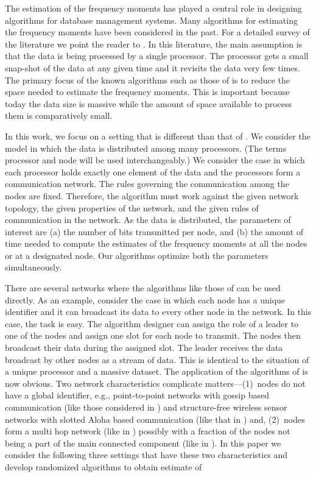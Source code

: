 \documentclass[10pt,twosided,a4paper,draft,onecolumn]{article}
\begin{document}
The estimation of the frequency moments has played a central role in
designing algorithms for database management systems. Many algorithms
for estimating the frequency moments have been considered in the
past. For a detailed survey of the literature we point the reader to
\cite{NelsonThesis11}. In this literature, the main assumption is that
the data is being processed by a single processor. The processor gets
a small snap-shot of the data at any given time and it revisits the
data very few times. The primary focus of the known algorithms such as
those of \cite{Alon96,Ganguly04,Coppersmith04} is to reduce the space
needed to estimate the frequency moments. This is important because
today the data size is massive while
the amount of space available to process them is comparatively small.

In this work, we focus on a setting that is different than that of
\cite{Alon96,Ganguly04,Coppersmith04}. We consider the model in which
the data is distributed among many processors. (The terms processor
and node will be used interchangeably.) We consider the case
in which each processor holds exactly one element of the data and the
processors form a communication network. The rules governing the
communication among the nodes are fixed. Therefore, the algorithm must
work against the given network topology, the given properties of the
network, and the given rules of communication in the network. As the
data is distributed, the parameters of interest are (a) the number of
bits transmitted per node, and (b) the amount of time needed to
compute the estimates of the frequency moments at all the nodes or at
a designated node. Our algorithms optimize both the parameters
simultaneously.

There are several networks where the algorithms like those of
\cite{Alon96,Ganguly04,Coppersmith04} can be used directly. As an
example, consider the case in which each node has a unique identifier
and it can broadcast its data to every other node in the network. In
this case, the task is easy. The algorithm designer can assign the
role of a leader to one of the nodes and assign one slot for each node
to transmit. The nodes then broadcast their data during the assigned
slot. The leader receives the data broadcast by other nodes as a
stream of data. This is identical to the situation of a unique
processor and a massive dataset. The application of the algorithms of \cite{Alon96,Ganguly04,Coppersmith04}
is now obvious. Two network characteristics
complicate matters---(1)~nodes do not have a global identifier, e.g.,
point-to-point networks with gossip based communication (like those considered in
\cite{Boyd05,Mosk-Aoyama06}) and structure-free wireless sensor
networks with slotted Aloha based communication (like that in
\cite{Kamath08}) and, (2)~nodes form a multi hop network (like in
\cite{Boyd05,Mosk-Aoyama06, Kamath08}) possibly with a fraction of the
nodes not being a part of the main connected component (like in
\cite{Iyer11}). In this paper we consider the following three settings
that have these two characteristics and develop randomized algorithms
to obtain estimate of 
\end{document}
